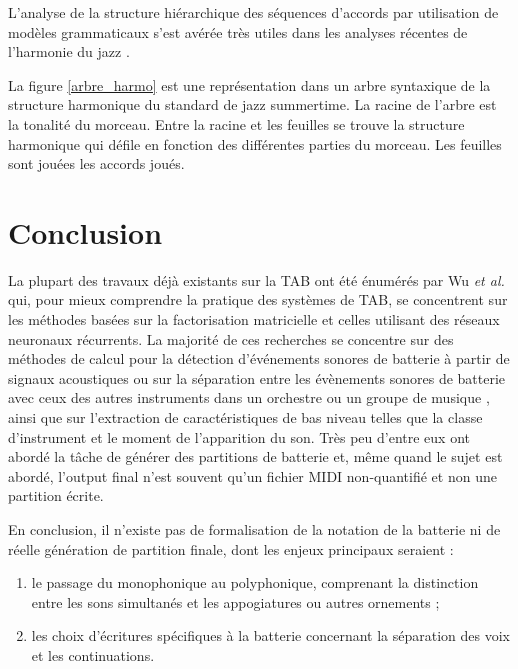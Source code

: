 L’analyse de la structure hiérarchique des séquences d’accords par utilisation
de modèles grammaticaux s’est avérée très utiles dans les analyses récentes de
l’harmonie du jazz \cite{harasimjazz}. 

La figure \ref{arbre_harmo} est une représentation dans un arbre syntaxique de
la structure harmonique du standard de jazz summertime. La racine de l’arbre
est la tonalité du morceau. Entre la racine et les feuilles se trouve la
structure harmonique qui défile en fonction des différentes parties du morceau.
Les feuilles sont jouées les accords joués.

\section*{Conclusion}
La plupart des travaux déjà existants sur la TAB ont été énumérés par Wu
\textit{et al.} \cite{Review_ADT} qui, pour mieux comprendre la pratique des
systèmes de TAB, se concentrent sur les méthodes basées sur la factorisation
matricielle et celles utilisant des réseaux neuronaux récurrents. La majorité
de ces recherches se concentre sur des méthodes de calcul pour la détection
d'événements sonores de batterie à partir de signaux acoustiques ou sur la
séparation entre les évènements sonores de batterie avec ceux des autres
instruments dans un orchestre ou un groupe de musique \cite{2802}, ainsi que
sur l'extraction de caractéristiques de bas niveau telles que la classe
d'instrument et le moment de l'apparition du son. Très peu d'entre eux ont
abordé la tâche de générer des partitions de batterie et, même quand le sujet
est abordé, l’output final n’est souvent qu’un fichier MIDI non-quantifié et
non une partition écrite.

En conclusion, il n’existe pas de formalisation de la notation de la batterie
ni de réelle génération de partition finale, dont les enjeux principaux
seraient :
\begin{enumerate}
    \item le passage du monophonique au polyphonique, comprenant la distinction
        entre les sons simultanés et les appogiatures ou autres ornements ;
    \item les choix d’écritures spécifiques à la batterie concernant la
        séparation des voix et les continuations.
\end{enumerate}
